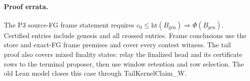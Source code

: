 \documentclass{article}
\newcommand{\genesis}{B_{\mathrm{gen}}}
\begin{document}
\paragraph{Proof errata.}
The P3 source-FG frame statement requires
$c_0\leq\mathrm{ht}(\genesis)\Rightarrow\Phi(\genesis)$.
Certified entries include genesis and all crossed entries.
Frame conclusions use the store and exact-FG frame premises and cover
every contest witness.  The tail proof also covers mixed finality
states: relay the finalized head and its certificate rows to the
terminal proposer, then use window retention and row selection.
The old Lean model closes this case through \textsf{TailKernelClaim\_W}.
\end{document}
